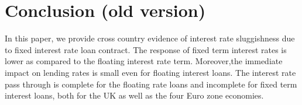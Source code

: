 \documentclass[12pt]{article}
\numberwithin{equation}{section}
\begin{document}

\section{Conclusion (old version)}

In this paper, we provide cross country evidence of interest rate sluggishness due to fixed interest rate loan contract. The response of fixed term interest rates is lower as compared to the floating interest rate term. Moreover,the immediate impact on lending rates is small even for floating interest loans. The interest rate pass through is complete for the floating rate loans and incomplete for fixed term interest loans, both for the UK as well as the four Euro zone economies.
\end{document}
